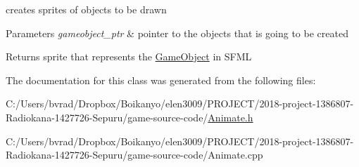 creates sprites of objects to be drawn 


\begin{DoxyParams}{Parameters}
{\em gameobject\+\_\+ptr} & pointer to the objects that is going to be created \\
\hline
\end{DoxyParams}
\begin{DoxyReturn}{Returns}
sprite that represents the \mbox{\hyperlink{class_game_object}{Game\+Object}} in S\+F\+ML 
\end{DoxyReturn}


The documentation for this class was generated from the following files\+:\begin{DoxyCompactItemize}
\item 
C\+:/\+Users/bvrad/\+Dropbox/\+Boikanyo/elen3009/\+P\+R\+O\+J\+E\+C\+T/2018-\/project-\/1386807-\/\+Radiokana-\/1427726-\/\+Sepuru/game-\/source-\/code/\mbox{\hyperlink{_animate_8h}{Animate.\+h}}\item 
C\+:/\+Users/bvrad/\+Dropbox/\+Boikanyo/elen3009/\+P\+R\+O\+J\+E\+C\+T/2018-\/project-\/1386807-\/\+Radiokana-\/1427726-\/\+Sepuru/game-\/source-\/code/Animate.\+cpp\end{DoxyCompactItemize}
